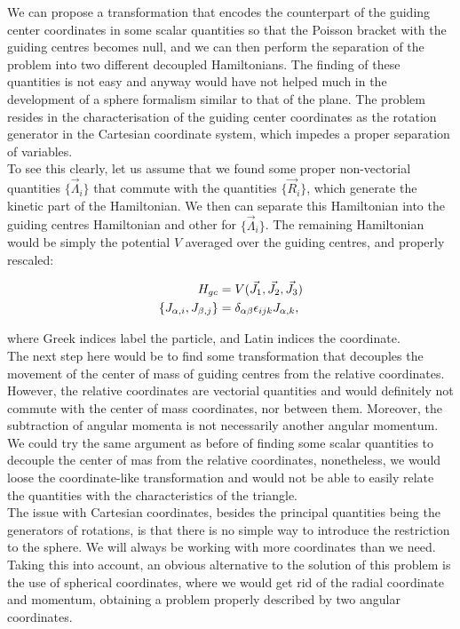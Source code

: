 We can propose a transformation that encodes the counterpart of the guiding center coordinates in some scalar quantities so that the Poisson bracket with the guiding centres becomes null, and we can then perform the separation of the problem into two different decoupled Hamiltonians. The finding of these quantities is not easy and anyway would have not helped much in the development of a sphere formalism similar to that of the plane. The problem resides in the characterisation of the guiding center coordinates as the rotation generator in the Cartesian coordinate system, which impedes a proper separation of variables.\\

To see this clearly, let us assume that we found some proper non-vectorial quantities $\{\vec{\Lambda}_i\}$ that commute with the quantities $\{\vec{R}_i\}$, which generate the kinetic part of the Hamiltonian. We then can separate this Hamiltonian into the guiding centres Hamiltonian and other for $\{\vec{\Lambda}_i\}$. The remaining Hamiltonian would be simply the potential $V$ averaged over the guiding centres, and properly rescaled:

\begin{align*}
H_{gc} &= V(\vec{J_1},\vec{J_2},\vec{J_3})\\
\left\lbrace J_{\alpha,i}, J_{\beta,j} \right\rbrace &= \delta_{\alpha\beta}\epsilon_{ijk} J_{\alpha,k},
\end{align*}

where Greek indices label the particle, and Latin indices the coordinate. \\

The next step here would be to find some transformation that decouples the movement of the center of mass of guiding centres from the relative coordinates. However, the relative coordinates are vectorial quantities and would definitely not commute with the center of mass coordinates, nor between them. Moreover, the subtraction of angular momenta is not necessarily another angular momentum. \\

We could try the same argument as before of finding some scalar quantities to decouple the center of mas from the relative coordinates, nonetheless, we would loose the coordinate-like transformation and would not be able to easily relate the quantities with the characteristics of the triangle.\\

The issue with Cartesian coordinates, besides the principal quantities being the generators of rotations, is that there is no simple way to introduce the restriction to the sphere. We will always be working with more coordinates than we need. Taking this into account, an obvious alternative to the solution of this problem is the use of spherical coordinates, where we would get rid of the radial coordinate and momentum, obtaining a problem properly described by two angular coordinates.

